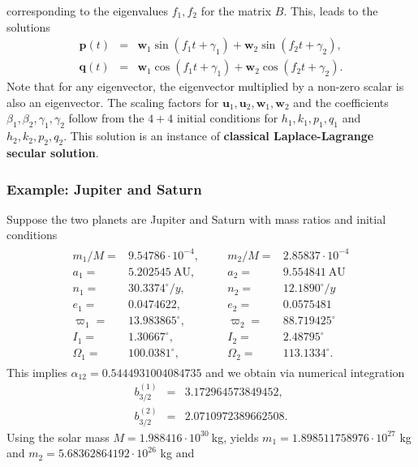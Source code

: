 \documentclass [12pt, a4paper] {article}
\newcommand{\vc}[1]
{
	\boldsymbol{#1}
}
\begin{document}
corresponding to the eigenvalues $f_1, f_2$ for the matrix $B$. This, leads to the solutions
\begin {eqnarray}
    \vc p(t) &=& \vc w_1\sin(f_1t + \gamma_1) + \vc w_2\sin(f_2t + \gamma_2), \\
    \vc q(t) &=& \vc w_1\cos(f_1t + \gamma_1) + \vc w_2\cos(f_2t + \gamma_2).
\end {eqnarray}
Note that for any eigenvector, the eigenvector multiplied by a non-zero scalar is 
also an eigenvector. The scaling factors for $\vc u_1, \vc u_2, \vc w_1, \vc w_2$
and the coefficients $\beta_1, \beta_2, \gamma_1, \gamma_2$ follow from the $4+4$
initial conditions for $h_1, k_1, p_1, q_1$ and $h_2, k_2, p_2, q_2$. This solution 
is an instance of \textbf{classical Laplace-Lagrange secular solution}.
\subsubsection{Example: Jupiter and Saturn}
Suppose the two planets are Jupiter and Saturn with mass ratios 
and initial conditions 
\begin {eqnarray}
    \begin {array}{llll}
        m_1/M = & 9.54786\cdot 10^{-4}, & m_2/M = &2.85837\cdot 10^{-4}
        \\
        a_1 = & 5.202545\:\textrm{AU}, \quad\quad & a_2 = & 9.554841\:\textrm{AU}
        \\
        n_1 = & 30.3374^\circ/y, & n_2 = & 12.1890^\circ/y
        \\
        e_1 = & 0.0474622, & e_2 = & 0.0575481
        \\
        \varpi_1 = & 13.983865^\circ, & \varpi_2 = & 88.719425^\circ 
        \\
        I_1 = & 1.30667^\circ, & I_2 = & 2.48795^\circ
        \\
        \Omega_1 = & 100.0381^\circ, & \Omega_2 = & 113.1334^\circ.
    \end {array}
\end {eqnarray}
This implies $\alpha_{12} = 0.5444931004084735$ and we obtain via numerical integration
\begin {eqnarray}
    b_{3/2}^{(1)} 
    &=&
    3.172964573849452,
    \\
    b_{3/2}^{(2)} 
    &=& 
    2.0710972389662508.
\end {eqnarray}
Using the solar mass $M = 1.988416\cdot 10^{30}\:$kg, yields 
$m_1 = 1.898511758976\cdot 10^{27}$ kg  
and 
$m_2 = 5.68362864192\cdot 10^{26}$ kg and 
\end{document}

